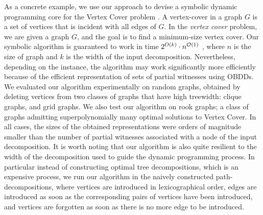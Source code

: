 As a concrete example, we use our approach to devise a symbolic dynamic programming core for the {\sc Vertex Cover} problem \cite{chen2024vertex,cai2017finding}. A vertex-cover in a graph $G$ is a set of vertices that is incident with all edges of $G$. In the {\em vertex cover} problem, we are given a graph $G$, and the goal is to find a minimum-size vertex cover. Our symbolic algorithm is guaranteed to work in time $2^{O(k)}\cdot n^{\mathcal{O}(1)}$
, where $n$ is the size of graph and $k$ is the width of the input decomposition. Nevertheless, depending on the instance, the algorithm may work significantly more efficiently because of the efficient representation of sets of partial witnesses using OBDDs. We evaluated our algorithm experimentally on random graphs, obtained by deleting vertices from two classes of graphs that have high treewidth: clique graphs, and grid graphs. We also test our algorithm on rook graphs; a class of graphs admitting superpolynomially many optimal solutions to {\sc Vertex Cover}. In all cases, the sizes of the obtained representations were orders of magnitude smaller than the number of partial witnesses associated with a node of the input decomposition.  It is worth noting that our algorithm is also quite resilient to the width of the decomposition used to guide the dynamic programming process. In particular instead of constructing optimal tree decompositions, which is an expensive process, we run our algorithm in the naively constructed path-decompositions, where vertices are introduced in lexicographical order, edges are introduced as soon as the corresponding pairs of vertices have been introduced, and vertices are forgotten as soon as there is no more edge to be introduced. 




